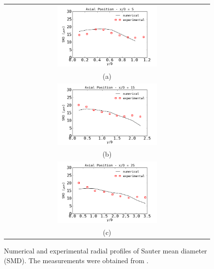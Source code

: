 \documentclass[preprint,12pt,review]{elsarticle}
\begin{document}
\begin{figure}[!htb]
 \centering
\begin{tabular}{c}
 \includegraphics[width=0.5\textwidth]{../thesis/figuras/chap5/smd/smd5.png} \\
(a) \\
 \includegraphics[width=0.5\textwidth]{../thesis/figuras/chap5/smd/smd15.png} \\
(b) \\
 \includegraphics[width=0.5\textwidth]{../thesis/figuras/chap5/smd/smd25.png} \\
(c) 
\end{tabular}
 \caption{Numerical and experimental radial profiles of Sauter mean diameter (SMD). The measurements were obtained from \citet{chen}.}
 \label{fig: SMDprofile}
\end{figure}
\end{document}
